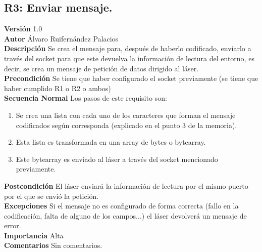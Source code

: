 \subsection{R3: Enviar mensaje.}
\textbf{Versión} 1.0\\
\textbf{Autor} Álvaro Ruifernández Palacios\\
\textbf{Descripción} Se crea el mensaje para, después de haberlo codificado, enviarlo a través del socket para que este devuelva la información de lectura del entorno, es decir, se crea un mensaje de petición de datos dirigido al láser.\\
\textbf{Precondición} Se tiene que haber configurado el socket previamente (se tiene que haber cumplido R1 o R2 o ambos)\\
\textbf{Secuencia Normal} Los pasos de este requisito son:
\begin{enumerate}
	\item Se crea una lista con cada uno de los caracteres que forman el mensaje codificados según corresponda (explicado en el punto 3 de la memoria).
	\item Esta lista es transformada en una array de bytes o bytearray.
	\item Este bytearray es enviado al láser a través del socket mencionado previamente.
\end{enumerate}
\textbf{Postcondición} El láser enviará la información de lectura por el mismo puerto por el que se envió la petición.\\
\textbf{Excepciones} Si el mensaje no es configurado de forma correcta (fallo en la codificación, falta de alguno de los campos...) el láser devolverá un mensaje de error.\\
\textbf{Importancia} Alta\\
\textbf{Comentarios} Sin comentarios.\\

